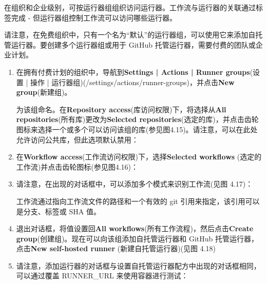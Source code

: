 在组织和企业级别，可按运行器组组织访问运行器。工作流与运行器的关联通过标签完成 - 但运行器组控制工作流可以访问哪些运行器。


请注意，在免费组织中，只有一个名为“默认”的运行器组，可以使用它来添加自托管运行器。要创建多个运行器组或用于 GitHub 托管运行器，需要付费的团队或企业计划。


\begin{enumerate}
\item 
在拥有付费计划的组织中，导航到\textbf{Settings | Actions | Runner groups}(设置 | 操作 | 运行器组)(/settings/actions/runner-groups)，并点击\textbf{New group}(新建组)。

为该组命名。在\textbf{Repository access}(库访问权限)下，将选择从\textbf{All repositories}(所有库)更改为\textbf{Selected repositories}(选定的库)，并点击齿轮图标来选择一个或多个可以访问该组的库(参见图4.15)。请注意，可以在此处允许访问公共库，但此选项默认禁用：


\item 
在\textbf{Workflow access}(工作流访问权限)下，选择\textbf{Selected workflows }(选定的工作流)并点击齿轮图标(参见图4.16)：


\item 
请注意，在出现的对话框中，可以添加多个模式来识别工作流(见图 4.17)：


工作流通过指向工作流文件的路径和一个有效的 git 引用来指定，该引用可以是分支、标签或 SHA 值。

\item 
退出对话框，将值设置回\textbf{All workflows}(所有工作流程)，然后点击\textbf{Create group}(创建组)。现在可以向该组添加自托管运行器和 GitHub 托管运行器，点击\textbf{New self-hosted runner }(新建自托管运行器)(见图 4.18)


\item 
请注意，添加运行器的对话框与设置自托管运行器配方中出现的对话框相同，可以通过覆盖 RUNNER\_URL 来使用容器进行测试：


\end{enumerate}
